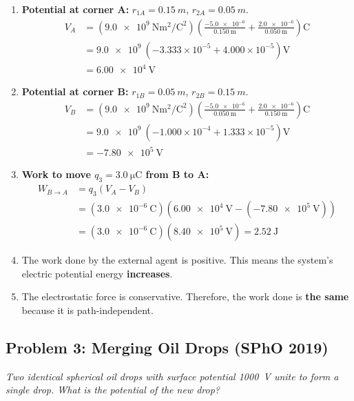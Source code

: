 \documentclass{article}
\numberwithin{equation}{section}
\begin{document}
\begin{enumerate}
    \item[(a)] \textbf{Potential at corner A:} $r_{1A} = \SI{0.15}{m}$, $r_{2A} = \SI{0.05}{m}$.
    \begin{align*}
        V_A &= (\SI{9.0e9}{\newton\meter\squared\per\coulomb\squared}) \left( \frac{\num{-5.0e-6}}{\SI{0.150}{\meter}} + \frac{\num{2.0e-6}}{\SI{0.050}{\meter}} \right) \si{\coulomb} \\
        &= \SI{9.0e9}{} \left( -3.333\times10^{-5} + 4.000\times10^{-5} \right) \si{\volt} \\
        &= \SI{+6.00e4}{\volt}
    \end{align*}

    \item[(b)] \textbf{Potential at corner B:} $r_{1B} = \SI{0.05}{m}$, $r_{2B} = \SI{0.15}{m}$.
    \begin{align*}
        V_B &= (\SI{9.0e9}{\newton\meter\squared\per\coulomb\squared}) \left( \frac{\num{-5.0e-6}}{\SI{0.050}{\meter}} + \frac{\num{2.0e-6}}{\SI{0.150}{\meter}} \right) \si{\coulomb} \\
        &= \SI{9.0e9}{} \left( -1.000\times10^{-4} + 1.333\times10^{-5} \right) \si{\volt} \\
        &= \SI{-7.80e5}{\volt}
    \end{align*}

    \item[(c)] \textbf{Work to move $q_3 = \SI{+3.0}{\micro\coulomb}$ from B to A:}
    \begin{align*}
        W_{B \to A} &= q_3 (V_A - V_B) \\
        &= (\SI{3.0e-6}{\coulomb}) (\SI{+6.00e4}{\volt} - (\SI{-7.80e5}{\volt})) \\
        &= (\SI{3.0e-6}{\coulomb}) (\SI{8.40e5}{\volt}) = \SI{+2.52}{\joule}
    \end{align*}

    \item[(d)] The work done by the external agent is positive. This means the system's electric potential energy \textbf{increases}.
    
    \item[(e) \& (f)] The electrostatic force is conservative. Therefore, the work done is \textbf{the same} because it is path-independent.
\end{enumerate}

\hrulefill
\subsection{Problem 3: Merging Oil Drops (SPhO 2019)}
\textit{Two identical spherical oil drops with surface potential \SI{1000}{V} unite to form a single drop. What is the potential of the new drop?}
\end{document}
